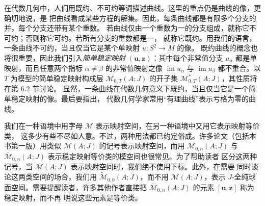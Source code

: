 在代数几何中，人们用既约、不可约等词描述曲线。这里的重点仍是曲线的像，更确切地说，是
把曲线看成某些方程的解集。因此，每条曲线都是有限多个分支的并，每个分支还带有某个重数。
若曲线仅由一个重数为一的分支组成，就称它不可约；否则称它可约。若所有分支的重数都是一，
就称它既约。用我们的语言，一条曲线不可约，当且仅当它是某个单映射 $u:S^2\to M$ 的像。
既约曲线的概念也将很重要，因此我们引入\emph{简单稳定映射}
$(\mathbf u,\mathbf z)$：其中每个非常值分支 $u_\alpha$ 都是单映射，而且任意两个指标
$\alpha\ne\beta$ 的非常值映射之像 $\operatorname{im}u_\alpha$ 与
$\operatorname{im}u_\beta$ 都不重合。以 $T$ 为模型的简单稳定映射构成层
$\mathcal M_{0,T}(A;J)$ 的开子集 $\mathcal M^*_{0,T}(A;J)$，其性质将在第 6.2 节讨论。
显然，一条曲线在代数几何意义下既约，当且仅当它是一个简单稳定映射的像。最后要指出，
代数几何学家常用“有理曲线”表示亏格为零的曲线。

\begin{remark}[记号]\label{rem:5-1-7}
我们在一种语境中用字母 $\mathcal M$ 表示映射空间，在另一种语境中又用它表示映射等价类，
这多少有些不尽如人意。不过，两种用法都已约定俗成。许多论文（包括本书第一版）用类似
$\mathcal M(A;J)$ 的记号表示映射空间，而用 $\mathcal M_{0,n}(A;J)$ 与
$\overline{\mathcal M}_{0,n}(A;J)$ 表示稳定映射等价类的模空间也很常见。为了帮助读者
区分这两种记号，当 $\mathcal M(A;J)$ 表示映射空间时，我们绝不使用下标。此外，在需要
同时谈论这两类空间的场合，我们用 $\widetilde{\mathcal M}_{0,0}(A;J)$，而不用
$\mathcal M(A;J)$，表示 $J$-全纯球面空间。需要提醒读者，许多其他作者直接把
$\overline{\mathcal M}_{0,n}(A;J)$ 的元素 $[\mathbf u,\mathbf z]$ 称为稳定映射，而不再
明说这些元素是等价类。
\end{remark}


